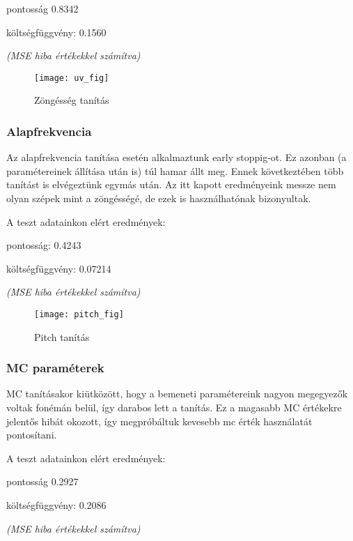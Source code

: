 	pontosság 0.8342
	
	költségfüggvény: 0.1560
	
	\textit{(MSE hiba értékekkel számítva)}

\begin{figure}[h]
	\par\centering
	\texttt{[image: uv\_fig]}
	\caption{Zöngésség tanítás}
\end{figure}

\subsubsection{Alapfrekvencia}
Az alapfrekvencia tanítása esetén alkalmaztunk early stoppig-ot. Ez azonban (a paramétereinek állítása után is) túl hamar állt meg. Ennek következtében több tanítást is elvégeztünk egymás után. Az itt kapott eredményeink messze nem olyan szépek mint a zöngésségé, de ezek is használhatónak bizonyultak.

A teszt adatainkon elért eredmények:

pontosság: 0.4243

költségfüggvény: 0.07214

\textit{(MSE hiba értékekkel számítva)}
\begin{figure}[h]
	\par\centering
	\texttt{[image: pitch\_fig]}
	\caption{Pitch tanítás}
\end{figure}
\subsubsection{MC paraméterek}
MC tanításakor kiütközött, hogy a bemeneti paramétereink nagyon megegyezők voltak fonémán belül, így darabos lett a tanítás. Ez a magasabb MC értékekre jelentős hibát okozott, így megpróbáltuk kevesebb mc érték használatát pontosítani.

	
	A teszt adatainkon elért eredmények:
	
	pontosság 0.2927
	
	költségfüggvény: 0.2086
	
	\textit{(MSE hiba értékekkel számítva)}
\begin{comment}
Innen hiányzik egy kép
\begin{figure}[h]
	\par\centering
	\texttt{[image: length\_fig]}
	\caption{MC paraméterek tanítása}
\end{figure}
\end{comment}
